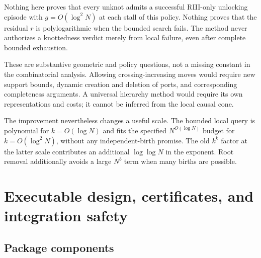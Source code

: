 \documentclass[11pt]{article}
\theoremstyle{definition}
\begin{document}
Nothing here proves that every unknot admits a successful RIII-only
unlocking episode with $g=O(\log^2N)$ at each stall of this policy.
Nothing proves that the residual $r$ is polylogarithmic when the bounded
search fails. The method never authorizes a knottedness verdict merely
from local failure, even after complete bounded exhaustion.

These are substantive geometric and policy questions, not a missing
constant in the combinatorial analysis. Allowing crossing-increasing moves
would require new support bounds, dynamic creation and deletion of ports,
and corresponding completeness arguments. A universal hierarchy method
would require its own representations and costs; it cannot be inferred
from the local causal cone.

The improvement nevertheless changes a useful scale. The bounded local
query is polynomial for $k=O(\log N)$ and fits the specified
$N^{O(\log N)}$ budget for $k=O(\log^2N)$, without any independent-birth
promise. The old $k^k$ factor at the latter scale contributes an additional
$\log\log N$ in the exponent. Root removal additionally avoids a large
$N^b$ term when many births are possible.

\section{Executable design, certificates, and integration safety}
\label{sec:implementation}

\subsection{Package components}
\end{document}
